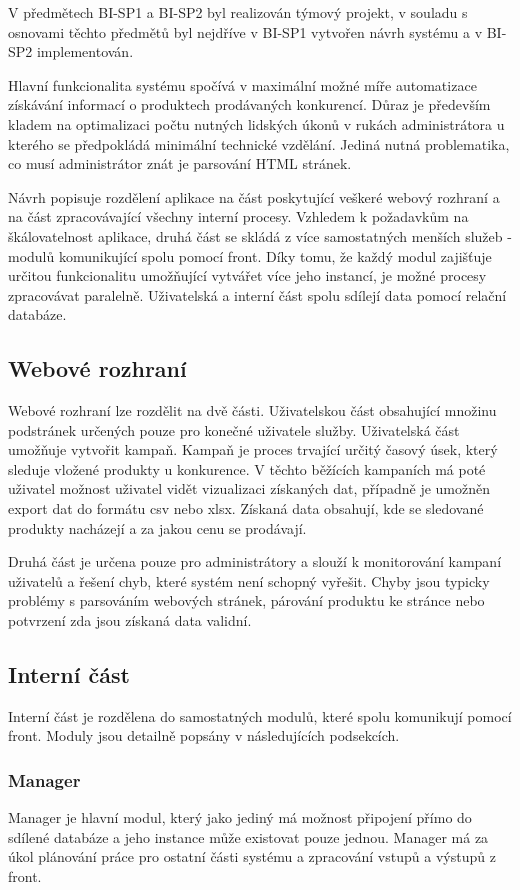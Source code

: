 \documentclass[thesis=B,czech]{FITthesis}[2012/06/26]
\begin{document}
V předmětech BI-SP1 a BI-SP2 byl realizován týmový projekt, v souladu s osnovami těchto předmětů byl nejdříve v BI-SP1 vytvořen návrh
systému a v BI-SP2 implementován.
\par
Hlavní funkcionalita systému spočívá v maximální možné míře automatizace získávání informací o produktech prodávaných konkurencí. Důraz je především kladem na optimalizaci počtu nutných lidských úkonů v rukách administrátora u kterého se předpokládá minimální technické vzdělání.
Jediná nutná problematika, co musí administrátor znát je parsování HTML stránek.
\par
Návrh popisuje rozdělení aplikace na část poskytující veškeré webový rozhraní a na část zpracovávající všechny interní procesy.
Vzhledem k požadavkům na škálovatelnost aplikace, druhá část se skládá z více samostatných menších služeb - modulů komunikující
spolu pomocí front. Díky tomu, že každý modul zajišťuje určitou funkcionalitu umožňující vytvářet více jeho instancí, je možné
procesy zpracovávat paralelně. 
Uživatelská a interní část spolu sdílejí data pomocí relační databáze\cite{DB}.
\par
\subsection{Webové rozhraní}
Webové rozhraní lze rozdělit na dvě části. Uživatelskou část obsahující množinu podstránek určených pouze pro konečné uživatele
služby. Uživatelská část umožňuje vytvořit kampaň. Kampaň je proces trvající určitý časový úsek, který sleduje vložené produkty u konkurence.
V těchto běžících kampaních má poté uživatel možnost uživatel vidět vizualizaci získaných dat, případně je umožněn export dat do formátu
csv nebo xlsx. Získaná data obsahují, kde se sledované produkty nacházejí a za jakou cenu se prodávají.
\par
Druhá část je určena pouze pro administrátory a slouží k monitorování kampaní uživatelů a řešení chyb, které systém není schopný vyřešit.
Chyby jsou typicky problémy s parsováním webových stránek, párování produktu ke stránce nebo potvrzení zda jsou získaná data validní.
\subsection{Interní část}
Interní část je rozdělena do samostatných modulů, které spolu komunikují pomocí front. Moduly jsou detailně popsány v následujících podsekcích.
\subsubsection{Manager}
Manager je hlavní modul, který jako jediný má možnost připojení přímo do sdílené databáze a jeho instance může existovat pouze jednou.
Manager má za úkol plánování práce pro ostatní části systému a zpracování vstupů a výstupů z front.
\end{document}
